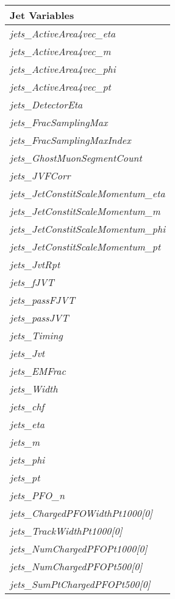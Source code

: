 \begin{table}[!htb]
    \centering
    \caption{}
    \label{tab:jet_variables}
    \begin{tabular}{l}
    \toprule
        Jet Variables \\
    \midrule
        \textit{jets\_ActiveArea4vec\_eta} \\
        \textit{jets\_ActiveArea4vec\_m} \\
        \textit{jets\_ActiveArea4vec\_phi} \\
        \textit{jets\_ActiveArea4vec\_pt} \\
        \textit{jets\_DetectorEta} \\
        \textit{jets\_FracSamplingMax} \\
        \textit{jets\_FracSamplingMaxIndex} \\
        \textit{jets\_GhostMuonSegmentCount} \\
        \textit{jets\_JVFCorr} \\
        \textit{jets\_JetConstitScaleMomentum\_eta} \\
        \textit{jets\_JetConstitScaleMomentum\_m} \\
        \textit{jets\_JetConstitScaleMomentum\_phi} \\
        \textit{jets\_JetConstitScaleMomentum\_pt} \\
        \textit{jets\_JvtRpt} \\
        \textit{jets\_fJVT} \\
        \textit{jets\_passFJVT} \\
        \textit{jets\_passJVT} \\
        \textit{jets\_Timing} \\
        \textit{jets\_Jvt} \\
        \textit{jets\_EMFrac} \\
        \textit{jets\_Width} \\
        \textit{jets\_chf} \\
        \textit{jets\_eta} \\
        \textit{jets\_m} \\
        \textit{jets\_phi} \\
        \textit{jets\_pt} \\
        \textit{jets\_PFO\_n} \\
        \textit{jets\_ChargedPFOWidthPt1000[0]} \\
        \textit{jets\_TrackWidthPt1000[0]} \\
        \textit{jets\_NumChargedPFOPt1000[0]} \\
        \textit{jets\_NumChargedPFOPt500[0]} \\
        \textit{jets\_SumPtChargedPFOPt500[0]} \\
    \bottomrule
    \end{tabular}
\end{table}
    

